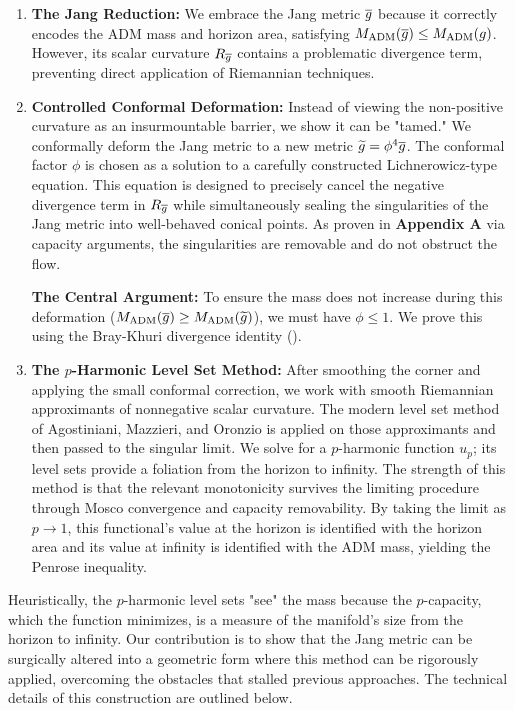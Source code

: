 \begin{enumerate}
    \item \textbf{The Jang Reduction:} We embrace the Jang metric $\overline{g}$ because it correctly encodes the ADM mass and horizon area, satisfying $M_{\mathrm{ADM}}(\overline{g}) \le M_{\mathrm{ADM}}(g)$. However, its scalar curvature $R_{\overline{g}}$ contains a problematic divergence term, preventing direct application of Riemannian techniques.

    \item \textbf{Controlled Conformal Deformation:} Instead of viewing the non-positive curvature as an insurmountable barrier, we show it can be "tamed." We conformally deform the Jang metric to a new metric $\widetilde{g} = \phi^4 \overline{g}$. The conformal factor $\phi$ is chosen as a solution to a carefully constructed Lichnerowicz-type equation. This equation is designed to precisely cancel the negative divergence term in $R_{\overline{g}}$ while simultaneously sealing the singularities of the Jang metric into well-behaved conical points. As proven in \textbf{Appendix A} via capacity arguments, the singularities are removable and do not obstruct the flow.

\textbf{The Central Argument:} To ensure the mass does not increase during this deformation ($M_{\mathrm{ADM}}(\overline{g}) \ge M_{\mathrm{ADM}}(\widetilde{g})$), we must have $\phi \le 1$. We prove this using the Bray-Khuri divergence identity ().
    \item \textbf{The $p$-Harmonic Level Set Method:} After smoothing the corner and applying the small conformal correction, we work with smooth Riemannian approximants of nonnegative scalar curvature. The modern level set method of Agostiniani, Mazzieri, and Oronzio is applied on those approximants and then passed to the singular limit. We solve for a $p$-harmonic function $u_p$; its level sets provide a foliation from the horizon to infinity. The strength of this method is that the relevant monotonicity survives the limiting procedure through Mosco convergence and capacity removability. By taking the limit as $p \to 1$, this functional's value at the horizon is identified with the horizon area and its value at infinity is identified with the ADM mass, yielding the Penrose inequality.
\end{enumerate}

Heuristically, the $p$-harmonic level sets "see" the mass because the $p$-capacity, which the function minimizes, is a measure of the manifold's size from the horizon to infinity. Our contribution is to show that the Jang metric can be surgically altered into a geometric form where this method can be rigorously applied, overcoming the obstacles that stalled previous approaches. The technical details of this construction are outlined below.

